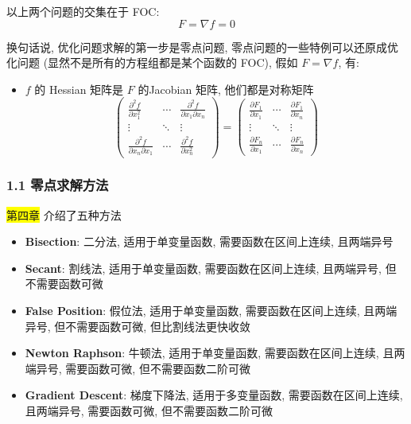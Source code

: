 以上两个问题的交集在于 FOC: 
$$ F = \nabla f = 0 $$

\begin{note}
换句话说, 优化问题求解的第一步是零点问题, 零点问题的一些特例可以还原成优化问题 (显然不是所有的方程组都是某个函数的 FOC), 假如 $F = \nabla f$, 有:
\begin{itemize}
    \item $f$ 的 Hessian 矩阵是 $F$ 的Jacobian 矩阵, 他们都是对称矩阵
    $$
    \begin{pmatrix}
        \frac{\partial^2 f}{\partial x_1^2} & \cdots & \frac{\partial^2 f}{\partial x_1 \partial x_n} \\
        \vdots & \ddots & \vdots \\
        \frac{\partial^2 f}{\partial x_n \partial x_1} & \cdots & \frac{\partial^2 f}{\partial x_n^2}
    \end{pmatrix} = \begin{pmatrix}
        \frac{\partial F_1}{\partial x_1} & \cdots & \frac{\partial F_1}{\partial x_n} \\
        \vdots & \ddots & \vdots \\
        \frac{\partial F_n}{\partial x_1} & \cdots & \frac{\partial F_n}{\partial x_n}
    \end{pmatrix}
$$
\end{itemize}
\end{note}

\subsubsection*{1.1 零点求解方法}
\colorbox{yellow}{第四章} 介绍了五种方法
\begin{itemize}
    \item \textbf{Bisection}: 二分法, 适用于单变量函数, 需要函数在区间上连续, 且两端异号
    \item \textbf{Secant}: 割线法, 适用于单变量函数, 需要函数在区间上连续, 且两端异号, 但不需要函数可微
    \item \textbf{False Position}: 假位法, 适用于单变量函数, 需要函数在区间上连续, 且两端异号, 但不需要函数可微, 但比割线法更快收敛
    \item \textbf{Newton Raphson}: 牛顿法, 适用于单变量函数, 需要函数在区间上连续, 且两端异号, 需要函数可微, 但不需要函数二阶可微
    \item \textbf{Gradient Descent}: 梯度下降法, 适用于多变量函数, 需要函数在区间上连续, 且两端异号, 需要函数可微, 但不需要函数二阶可微
\end{itemize}

